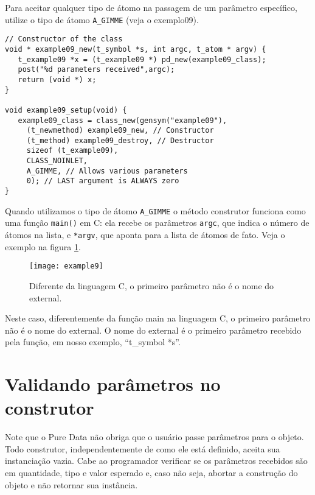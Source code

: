 Para aceitar qualquer tipo de átomo na passagem de um parâmetro específico,
utilize o tipo de átomo \texttt{A\_GIMME} (veja o exemplo09).

\begin{lstlisting}[caption=Objeto que recebe qualquer tipo de parâmetro]
// Constructor of the class
void * example09_new(t_symbol *s, int argc, t_atom * argv) {
   t_example09 *x = (t_example09 *) pd_new(example09_class);
   post("%d parameters received",argc);
   return (void *) x;
}

void example09_setup(void) {
   example09_class = class_new(gensym("example09"),
     (t_newmethod) example09_new, // Constructor
     (t_method) example09_destroy, // Destructor
     sizeof (t_example09),
     CLASS_NOINLET,
     A_GIMME, // Allows various parameters
     0); // LAST argument is ALWAYS zero
}
\end{lstlisting}

Quando utilizamos o tipo de átomo \texttt{A\_GIMME} o método construtor
funciona como uma função \texttt{main()} em C: ela recebe os parâmetros
\texttt{argc}, que indica o número de átomos na lista, e \texttt{*argv}, que
aponta para a lista de átomos de fato. Veja o exemplo na figura
\ref{fig:construtor-parametros}.

\begin{figure}[h!]
\centering
\texttt{[image: example9]}
\caption{Diferente da linguagem C, o primeiro parâmetro não é o nome do external.}
\label{fig:construtor-parametros}
\end{figure}

Neste caso, diferentemente da função main na linguagem C, o primeiro parâmetro
não é o nome do external.
O nome do external é o primeiro parâmetro recebido pela função, em nosso exemplo,
``t\_symbol *s''.

\section{Validando parâmetros no construtor}

Note que o Pure Data não obriga que o usuário passe parâmetros para o objeto.
Todo construtor, independentemente de como ele está definido, aceita
sua instanciação vazia.
Cabe ao programador verificar se os parâmetros recebidos são em quantidade,
tipo e valor esperado e, caso não seja, abortar a construção do objeto e não
retornar sua instância.

